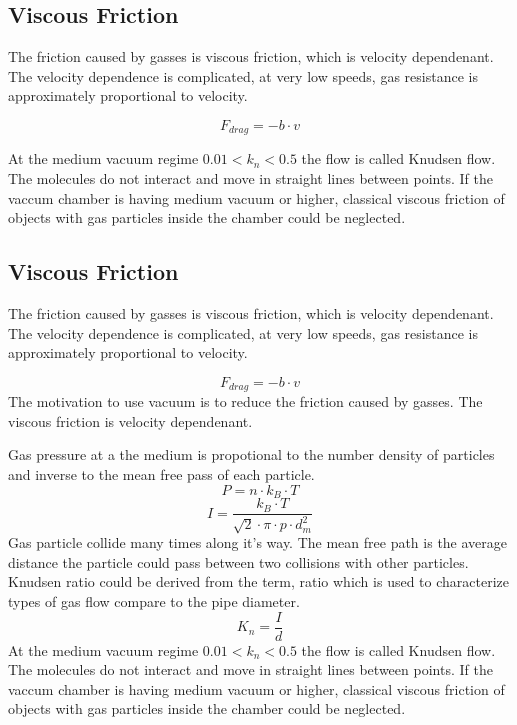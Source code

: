 \documentclass[\main/master.tex]{subfiles}
\begin{document}
\subsection{Viscous Friction}
The friction caused by gasses is viscous friction, which is velocity dependenant. The velocity dependence is complicated, at very low speeds, gas resistance is approximately proportional to velocity. 

\begin{equation}
F_{drag} = -b\cdot v  \label{eqn:energy-mass-equivalence-relation}
\end{equation}

At the medium vacuum regime $0.01<k_n<0.5$ the flow is called Knudsen flow. The molecules do not interact and move in straight lines between points. If the vaccum chamber is having medium vacuum or higher, classical viscous friction of objects with gas particles inside the chamber could be neglected.




\subsection{Viscous Friction}
The friction caused by gasses is viscous friction, which is velocity dependenant. The velocity dependence is complicated, at very low speeds, gas resistance is approximately proportional to velocity. 

\begin{equation}
F_{drag} = -b\cdot v  \label{eqn:energy-mass-equivalence-relation}
\end{equation}
The motivation to use vacuum is to reduce the friction caused by gasses. The viscous friction is velocity dependenant.

Gas pressure at a the medium is  propotional to the number density of particles and inverse to the mean free pass of each particle.    
\begin{equation}
P = n\cdot k_B\cdot T  \label{eqn:ideal-gasses}
\end{equation}
\begin{equation}
I = \frac{k_B\cdot T}{\sqrt{2}\cdot\pi\cdot p\cdot d_m^2}     \label{eqn:mean-free-pass}
\end{equation}
Gas particle collide many times along it's way. The mean free path is the average distance the particle could pass between two collisions with other particles. Knudsen ratio could be derived from the term, ratio which is used to characterize types of gas flow compare to the pipe diameter.
\begin{equation}
K_n = \frac{I}{d}     \label{eqn:mean-free-pass}
\end{equation}
At the medium vacuum regime $0.01<k_n<0.5$ the flow is called Knudsen flow. The molecules do not interact and move in straight lines between points. If the vaccum chamber is having medium vacuum or higher, classical viscous friction of objects with gas particles inside the chamber could be neglected.
\end{document}
